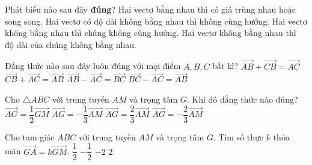 \begin{ex}
	Phát biểu nào sau đây \textbf{đúng}?
	\choice
	{\True Hai vectơ bằng nhau thì có giá trùng nhau hoặc song song.}
	{Hai vectơ có độ dài không bằng nhau thì không cùng hướng.}
	{Hai vectơ không bằng nhau thì chúng không cùng hướng.}
	{Hai vectơ không bằng nhau thì độ dài của chúng không bằng nhau.}
\end{ex}

\begin{ex}
	Đẳng thức nào sau đây luôn đúng với mọi điểm $A, B, C$ bất kì?
	\choice
	{$\overrightarrow{AB} + \overrightarrow{CB} = \overrightarrow{AC}$}
	{\True $\overrightarrow{CB} + \overrightarrow{AC} = \overrightarrow{AB}$}
	{$\overrightarrow{AB} - \overrightarrow{AC} = \overrightarrow{BC}$}
	{$\overrightarrow{BC} - \overrightarrow{AC} = \overrightarrow{AB}$}
\end{ex}

\begin{ex}
	Cho $\triangle ABC$ với trung tuyến $AM$ và trọng tâm $G$. Khi đó đẳng thức nào đúng?
	\choice
	{$\overrightarrow{AG} = \dfrac{1}{2}\overrightarrow{GM}$}
	{$\overrightarrow{AG} = -\dfrac{1}{3}\overrightarrow{AM}$}
	{\True $\overrightarrow{AG} = \dfrac{2}{3}\overrightarrow{AM}$}
	{$\overrightarrow{AG} = -\dfrac{2}{3}\overrightarrow{AM}$}
\end{ex}

\begin{ex}
	Cho tam giác $ABC$ với trung tuyến $AM$ và trọng tâm $G$. Tìm số thực $k$ thỏa mãn $\overrightarrow{GA} = k\overrightarrow{GM}$.
	\choice
	{$\dfrac{1}{2}$}
	{$-\dfrac{1}{2}$}
	{\True $-2$}
	{$2$}
\end{ex}

